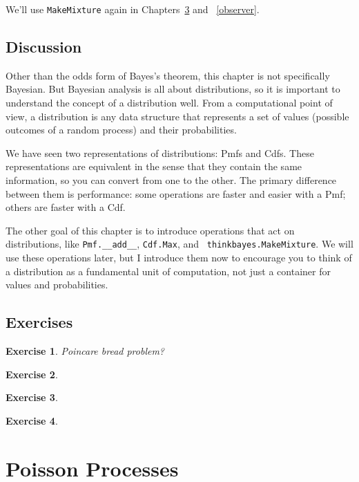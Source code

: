 \documentclass[12pt]{book}
\theoremstyle{exercise}
\newtheorem{exercise}{Exercise}[chapter]
\begin{document}
We'll use {\tt MakeMixture} again in Chapters~\ref{prediction} and
~\ref{observer}.


\section{Discussion}

Other than the odds form of Bayes's theorem, this chapter is not
specifically Bayesian.  But Bayesian analysis is all about
distributions, so it is important to understand the concept of a
distribution well.  From a computational point of view, a distribution
is any data structure that represents a set of values (possible
outcomes of a random process) and their probabilities.

We have seen two representations of distributions: Pmfs and Cdfs.
These representations are equivalent in the sense that they contain
the same information, so you can convert from one to the other.  The
primary difference between them is performance: some operations are
faster and easier with a Pmf; others are faster with a Cdf.
 

The other goal of this chapter is to introduce operations that act on
distributions, like \verb"Pmf.__add__", {\tt Cdf.Max}, and {\tt
  thinkbayes.MakeMixture}.  We will use these operations later, but I
introduce them now to encourage you to think of a distribution as a
fundamental unit of computation, not just a container for values and
probabilities.

\section{Exercises}

\begin{exercise}
Poincare bread problem?
\end{exercise}


\begin{exercise}
\end{exercise}


\begin{exercise}
\end{exercise}


\begin{exercise}
\end{exercise}




\chapter{Poisson Processes}
\label{prediction}
\end{document}
